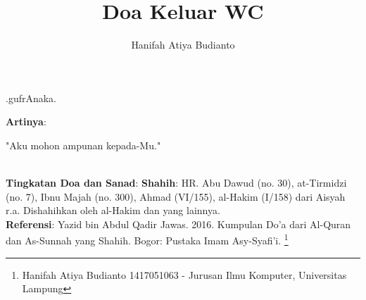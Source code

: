 \documentclass[a4paper,12pt]{article}
\title{\Large Doa Keluar WC}
\author{\calligra Hanifah Atiya Budianto}
\begin{document}
\sffamily
\maketitle 
\fullvocalize
{}
\begin{arabtext}
\noindent
.gufrAnaka.\\
\end{arabtext}
\noindent
\textbf{Artinya}:
\par
\indent
"Aku mohon ampunan kepada-Mu."\\\\
\par
\noindent
\textbf{Tingkatan Doa dan Sanad}: \textbf{Shahih}: HR. Abu Dawud (no. 30),
at-Tirmidzi (no. 7), Ibnu Majah (no. 300), Ahmad (VI/155), al-Hakim (I/158)
dari Aisyah r.a. Dishahihkan oleh al-Hakim dan yang lainnya.\\
\textbf{Referensi}: Yazid bin Abdul Qadir Jawas. 2016. Kumpulan Do'a dari
Al-Quran dan As-Sunnah yang Shahih. Bogor: Pustaka Imam Asy-Syafi'i.
\footnote{Hanifah Atiya Budianto 1417051063 - Jurusan Ilmu Komputer,
Universitas Lampung}
\end{document}
